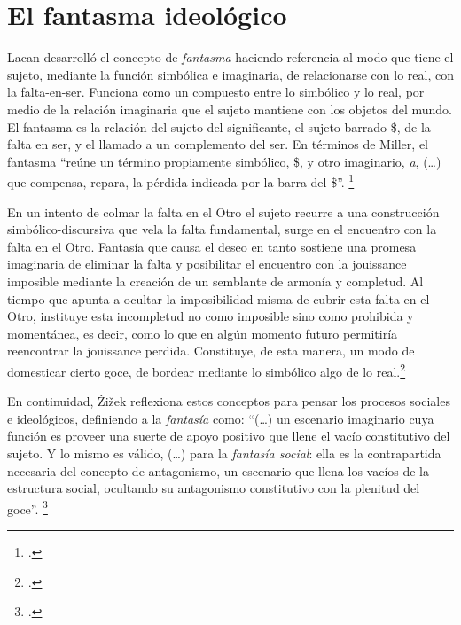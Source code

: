 \section{El fantasma ideológico}

Lacan desarrolló el concepto de \emph{fantasma} haciendo referencia al modo que tiene el sujeto, mediante la función simbólica e imaginaria, de relacionarse con lo real, con la falta-en-ser. Funciona como un compuesto entre lo simbólico y lo real, por medio de la relación imaginaria que el sujeto mantiene con los objetos del mundo. El fantasma es la relación del sujeto del significante, el sujeto barrado \$, de la falta en ser, y el llamado a un complemento del ser. En términos de Miller, el fantasma \enquote{reúne un término propiamente simbólico, \$, y otro imaginario, \emph{a}, (\ldots) que compensa, repara, la pérdida indicada por la barra del \$}. \footcite[][286]{@7110-MILLER1998}

En un intento de colmar la falta en el Otro el sujeto recurre a una construcción simbólico-discursiva que vela la falta fundamental, surge en el encuentro con la falta en el Otro. Fantasía que causa el deseo en tanto sostiene una promesa imaginaria de eliminar la falta y posibilitar el encuentro con la jouissance imposible mediante la creación de un semblante de armonía y completud. Al tiempo que apunta a ocultar la imposibilidad misma de cubrir esta falta en el Otro, instituye esta incompletud no como imposible sino como prohibida y momentánea, es decir, como lo que en algún momento futuro permitiría reencontrar la jouissance perdida. Constituye, de esta manera, un modo de domesticar cierto goce, de bordear mediante lo simbólico algo de lo real.\footcite[]{@7107-STAVRAKAKIS2007}

En continuidad, Žižek reflexiona estos conceptos para pensar los procesos sociales e ideológicos, definiendo a la \emph{fantasía} como: \enquote{(\ldots) un escenario imaginario cuya función es proveer una suerte de apoyo positivo que llene el vacío constitutivo del sujeto. Y lo mismo es válido, (\ldots) para la \emph{fantasía social}: ella es la contrapartida necesaria del concepto de antagonismo, un escenario que llena los vacíos de la estructura social, ocultando su antagonismo constitutivo con la plenitud del goce}. \footcite[][262]{@7111-ZIZEK2003}

